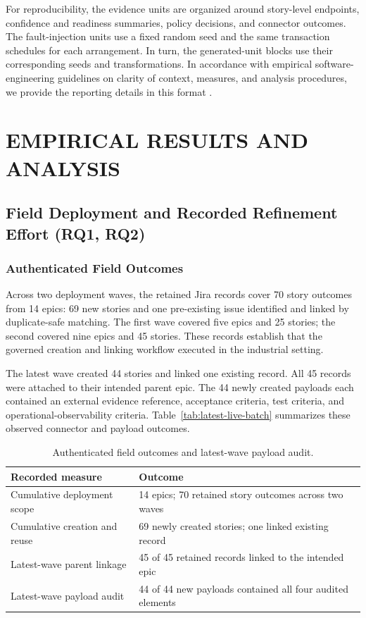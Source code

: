 \documentclass[manuscript,review]{acmart}
\begin{document}
For reproducibility, the evidence units are organized around story-level endpoints, confidence and readiness summaries, policy decisions, and connector outcomes. The fault-injection units use a fixed random seed and the same transaction schedules for each arrangement. In turn, the generated-unit blocks use their corresponding seeds and transformations. In accordance with empirical software-engineering guidelines on clarity of context, measures, and analysis procedures, we provide the reporting details in this format \cite{R54,R71,R55,R70}.

\FloatBarrier
\section{EMPIRICAL RESULTS AND ANALYSIS}

\subsection{Field Deployment and Recorded Refinement Effort (RQ1, RQ2)}
\subsubsection{Authenticated Field Outcomes}
Across two deployment waves, the retained Jira records cover 70 story outcomes from 14 epics: 69 new stories and one pre-existing issue identified and linked by duplicate-safe matching. The first wave covered five epics and 25 stories; the second covered nine epics and 45 stories. These records establish that the governed creation and linking workflow executed in the industrial setting.

The latest wave created 44 stories and linked one existing record. All 45 records were attached to their intended parent epic. The 44 newly created payloads each contained an external evidence reference, acceptance criteria, test criteria, and operational-observability criteria. Table~\ref{tab:latest-live-batch} summarizes these observed connector and payload outcomes.

\begin{table}[htbp]
\centering
\small
\caption{Authenticated field outcomes and latest-wave payload audit.}
\label{tab:cumulative-live-evidence}
\label{tab:latest-live-batch}
\label{tab:live-endpoint-statistics}
\begin{tabularx}{\textwidth}{@{}lX@{}}
\toprule
Recorded measure & Outcome \\
\midrule
Cumulative deployment scope & 14 epics; 70 retained story outcomes across two waves \\
Cumulative creation and reuse & 69 newly created stories; one linked existing record \\
Latest-wave parent linkage & 45 of 45 retained records linked to the intended epic \\
Latest-wave payload audit & 44 of 44 new payloads contained all four audited elements \\
\bottomrule
\end{tabularx}
\end{table}
\end{document}
